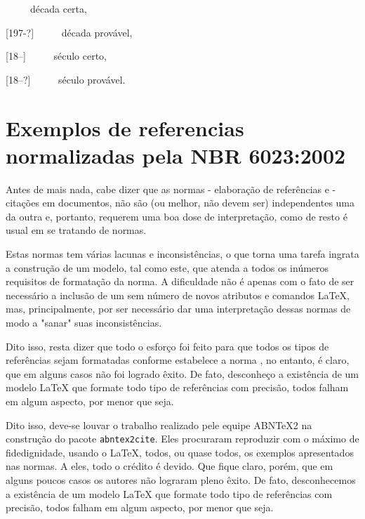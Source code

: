 \begin{apendicesenv}
[197-] \ \ \ \ \ década certa,

[197-?] \ \ \ \ \ década provável,

[18--] \ \ \ \ \ século certo,

[18--?] \ \ \ \ \ século provável.







\chapter{Exemplos de referencias normalizadas pela NBR 6023:2002}
\label{chap:apExemplosRefs}

Antes de mais nada, cabe dizer que as normas  - elaboração de referências e  - citações em documentos, não são (ou melhor, não devem ser) independentes uma da outra e, portanto, requerem uma boa dose de interpretação, como de resto é usual em se tratando de normas.

Estas normas tem várias lacunas e inconsistências, o que torna uma tarefa ingrata a construção de um modelo, tal como este, que atenda a todos os inúmeros requisitos de formatação da norma. A dificuldade não é apenas com o fato de ser necessário a inclusão de um sem número de novos atributos e comandos \LaTeX{}, mas, principalmente, por ser necessário dar uma interpretação dessas normas de modo a "sanar"{} suas inconsistências.

Dito isso, resta dizer que todo o esforço foi feito para que todos os tipos de referências sejam formatadas conforme estabelece a norma , no entanto, é claro, que em alguns casos não foi logrado êxito. De fato, desconheço a existência de um modelo \LaTeX{} que formate todo tipo de referências com precisão, todos falham em algum aspecto, por menor que seja.

Dito isso, deve-se louvar o trabalho realizado pele equipe  \textsc{ABN}\TeX\textsc{2} na construção do pacote \texttt{abntex2cite}. Eles procuraram reproduzir com o máximo de fidedignidade, usando o \LaTeX, todos, ou quase todos, os exemplos apresentados nas normas. A eles, todo o crédito é devido. Que fique claro, porém, que em alguns poucos casos os autores não lograram pleno êxito. De fato, desconhecemos a existência de um modelo \LaTeX{} que formate todo tipo de referências com precisão, todos falham em algum aspecto, por menor que seja.


\end{apendicesenv}
